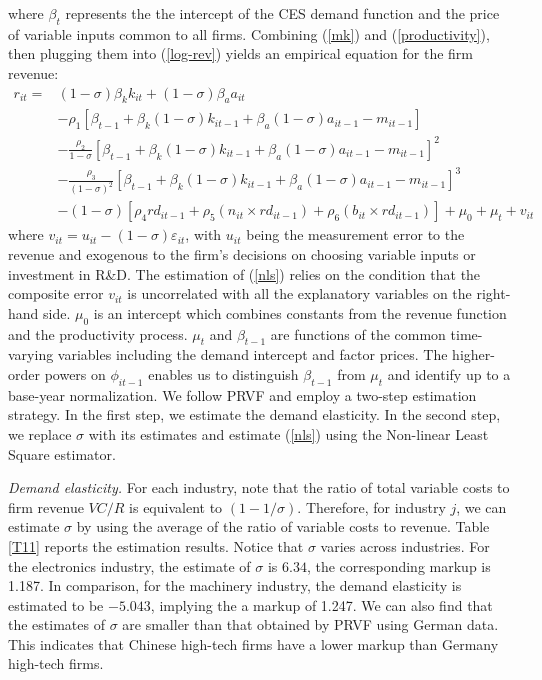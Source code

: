 \documentclass[11pt]{article}
\begin{document}
where $\beta_{t}$ represents the the intercept of the CES demand function and the price of variable inputs common to all firms. Combining (\ref{mk}) and (\ref{productivity}), then plugging them into (\ref{log-rev}) yields an empirical equation for
the firm revenue:
\begin{align} \label{nls}
r_{it}=& \left(1-\sigma\right)\beta_{k}k_{it}+\left(1-\sigma\right)\beta_{a}a_{it}  \\
       &-\rho_{1}\left[\beta_{t-1}+\beta_{k}\left(1-\sigma\right)k_{it-1}+\beta_{a}\left(1-\sigma\right)a_{it-1}-m_{it-1}\right] \nonumber \\
 & -\frac{\rho_{2}}{1-\sigma}\left[\beta_{t-1}+\beta_{k}\left(1-\sigma\right)k_{it-1}+\beta_{a}\left(1-\sigma\right)a_{it-1}-m_{it-1}\right]^{2} \nonumber \\
 & -\frac{\rho_{3}}{\left(1-\sigma\right)^{2}}\left[\beta_{t-1}+\beta_{k}\left(1-\sigma\right)k_{it-1}+\beta_{a}\left(1-\sigma\right)a_{it-1}-m_{it-1}\right]^{3} \nonumber \\
 & -\left(1-\sigma\right)\left[\rho_{4}rd_{it-1}+\rho_{5}\left( n_{it}\times rd_{it-1}\right)+\rho_{6}\left( b_{it} \times rd_{it-1}\right)\right]+ \mu_{0}+\mu_{t}+v_{it} \nonumber 
\end{align}
where $v_{it}=u_{it}-\left(1-\sigma\right)\varepsilon_{it}$, with 
$u_{it}$ being the measurement error to the revenue and exogenous to
the firm's decisions on choosing variable inputs or investment in
R\&D. The estimation of (\ref{nls}) relies on the condition that
the composite error $v_{it}$ is uncorrelated with all the explanatory
variables on the right-hand side. $\mu_{0}$ is an intercept which
combines constants from the revenue function and the productivity
process. $\mu_{t}$ and $\beta_{t-1}$ are functions of the common
time-varying variables including the demand intercept and factor prices. The higher-order powers on $\phi_{it-1}$ enables us to distinguish $\beta_{t-1}$ from $\mu_{t}$ and identify up to a base-year normalization. We follow PRVF and employ a two-step estimation strategy. In the first step, we estimate the demand elasticity. In the second step, we replace $\sigma$ with its estimates and estimate (\ref{nls}) using the Non-linear Least Square estimator.

\textit{Demand elasticity.} For each industry, note that the ratio of total variable costs to firm revenue $VC/R$ is equivalent to $\left(1-1/\sigma \right)$. Therefore, for industry $j$, we can estimate $\sigma$ by using the average of the ratio of variable costs to revenue. Table \ref{T11} reports the estimation results. Notice that $\sigma$ varies across industries. For the electronics industry, the estimate of $\sigma$ is $6.34$, the corresponding markup is 1.187. In comparison,
for the machinery industry, the demand elasticity is estimated
to be $-5.043$, implying the a markup of 1.247. We can also find
that the estimates of $\sigma$ are smaller than that obtained by PRVF using German data.
This indicates that Chinese high-tech firms have a lower markup than
Germany high-tech firms. 
\end{document}
